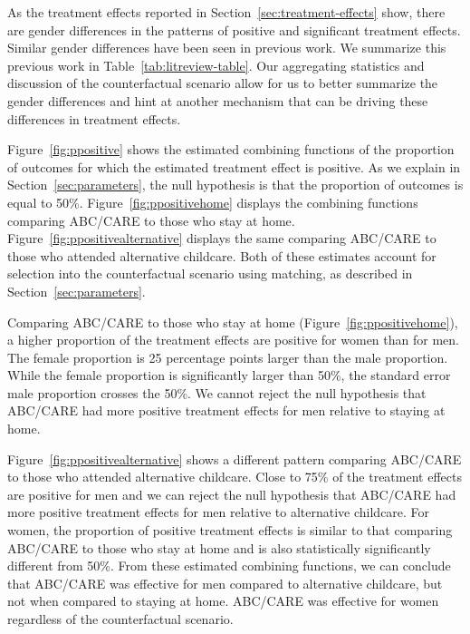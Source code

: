 
As the treatment effects reported in Section~\ref{sec:treatment-effects} show, there are gender differences in the patterns of positive and significant treatment effects. Similar gender differences have been seen in previous work. We summarize this previous work in Table~\ref{tab:litreview-table}. Our aggregating statistics and discussion of the counterfactual scenario allow for us to better summarize the gender differences and hint at another mechanism that can be driving these differences in treatment effects.

Figure~\ref{fig:ppositive} shows the estimated combining functions of the proportion of outcomes for which the estimated treatment effect is positive. As we explain in Section~\ref{sec:parameters}, the null hypothesis is that the proportion of outcomes is equal to 50\%. Figure~\ref{fig:ppositivehome} displays the combining functions comparing ABC/CARE to those who stay at home. Figure~\ref{fig:ppositivealternative} displays the same comparing ABC/CARE to those who attended alternative childcare. Both of these estimates account for selection into the counterfactual scenario using matching, as described in Section~\ref{sec:parameters}.

Comparing ABC/CARE to those who stay at home (Figure~\ref{fig:ppositivehome}), a higher proportion of the treatment effects are positive for women than for men. The female proportion is 25 percentage points larger than the male proportion. While the female proportion is significantly larger than 50\%, the standard error male proportion crosses the 50\%. We cannot reject the null hypothesis that ABC/CARE had more positive treatment effects for men relative to staying at home. 

Figure~\ref{fig:ppositivealternative} shows a different pattern comparing ABC/CARE to those who attended alternative childcare. Close to 75\% of the treatment effects are positive for men and we can reject the null hypothesis that ABC/CARE had more positive treatment effects for men relative to alternative childcare. For women, the proportion of positive treatment effects is similar to that comparing ABC/CARE to those who stay at home and is also statistically significantly different from 50\%. From these estimated combining functions, we can conclude that ABC/CARE was effective for men compared to alternative childcare, but not when compared to staying at home. ABC/CARE was effective for women regardless of the counterfactual scenario. 

